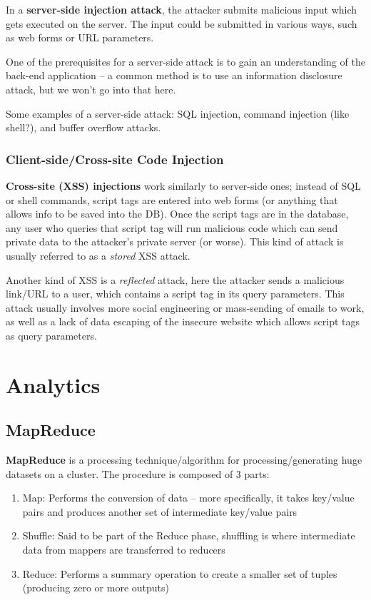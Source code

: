 \documentclass{report}
\newcommand{\npar}{\par\noindent}
\newcommand{\vpar}{\vspace{1em}\npar}
\begin{document}
\par In a \textbf{server-side injection attack}, the attacker submits malicious input which gets executed on the server. The input could be submitted in various ways, such as web forms or URL parameters.

\vpar One of the prerequisites for a server-side attack is to gain an understanding of the back-end application -- a common method is to use an information disclosure attack, but we won't go into that here.

\vpar Some examples of a server-side attack: SQL injection, command injection (like shell?), and buffer overflow attacks.

\newpage
\subsection{Client-side/Cross-site Code Injection}

\par \textbf{Cross-site (XSS) injections} work similarly to server-side ones; instead of SQL or shell commands, script tags are entered into web forms (or anything that allows info to be saved into the DB). Once the script tags are in the database, any user who queries that script tag will run malicious code which can send private data to the attacker's private server (or worse). This kind of attack is usually referred to as a \textit{stored} XSS attack.

\vpar Another kind of XSS is a \textit{reflected} attack, here the attacker sends a malicious link/URL to a user, which contains a script tag in its query parameters. This attack usually involves more social engineering or mass-sending of emails to work, as well as a lack of data escaping of the insecure website which allows script tags as query parameters.

\chapter{Analytics}

\section{MapReduce}

\par \textbf{MapReduce} is a processing technique/algorithm for processing/generating huge datasets on a cluster. The procedure is composed of 3 parts:

\begin{enumerate}
    \item Map: Performs the conversion of data -- more specifically, it takes key/value pairs and produces another set of intermediate key/value pairs
    \item Shuffle: Said to be part of the Reduce phase, shuffling is where intermediate data from mappers are transferred to reducers
    \item Reduce: Performs a summary operation to create a smaller set of tuples (producing zero or more outputs)
\end{enumerate}
\end{document}
